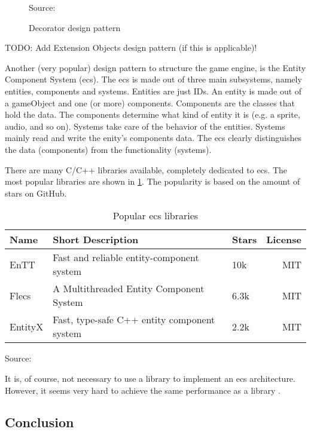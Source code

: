 \documentclass{projdoc}
\begin{document}
\begin{figure}
	\centering
	\caption{Decorator design pattern}
	Source: \autocite{img:Decorator}
	\label{fig:decorator}
\end{figure}

TODO: Add Extension Objects design pattern (if this is applicable)!

Another (very popular) design pattern to structure the game engine, is the Entity
Component System (\gls{ecs}). The \gls{ecs} is made out of three main subsystems,
namely entities, components and systems. Entities are just IDs. An entity is made out
of a gameObject and one (or more) components. Components are the classes that hold
the data. The components determine what kind of entity it is (e.g. a sprite, audio,
and so on). Systems take care of the behavior of the entities. Systems mainly read
and write the enity's components data. The \gls{ecs} clearly distinguishes the data
(components) from the functionality (systems).


There are many C/C++ libraries available, completely dedicated to \gls{ecs}. The most
popular libraries are shown in \cref{tab:popularECSLibraries}. The popularity is
based on the amount of stars on GitHub.

\begin{table}
	\centering
	\begin{tabular}{ll@{\qquad}lr}
		\toprule
		\textbf{Name} & \textbf{Short Description} & \textbf{Stars} & \textbf{License}\\
		\midrule
		EnTT & Fast and reliable entity-component system & 10k & MIT\\
		Flecs & A Multithreaded Entity Component System & 6.3k & MIT\\
		EntityX & Fast, type-safe C++ entity component system & 2.2k & MIT\\
		\bottomrule
	\end{tabular}
	\caption{Popular \gls{ecs} libraries}
	Source: \autocite{github:awesome-ecs}
	\label{tab:popularECSLibraries}
\end{table}

It is, of course, not necessary to use a library to implement an \gls{ecs}
architecture. However, it seems very hard to achieve the same performance as a
library \autocite{github:ecsfaq}.

\subsection{Conclusion}
\end{document}
